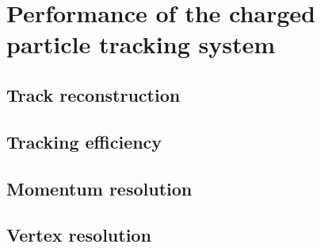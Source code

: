 \section[Performance of the charged particle tracking system (Simon)]{Performance of the charged particle tracking system}
\subsection{Track reconstruction}
\subsection{Tracking efficiency}
\subsection{Momentum resolution}
\subsection{Vertex resolution}